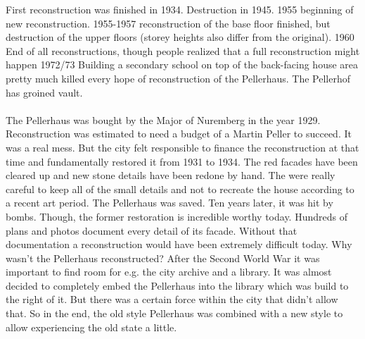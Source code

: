 First reconstruction was finished in 1934.
Destruction in 1945.
1955 beginning of new reconstruction.
1955-1957 reconstruction of the base floor finished, but destruction of the upper floors (storey heights also differ from the original).
1960 End of all reconstructions, though people realized that a full reconstruction might happen
1972/73 Building a secondary school on top of the back-facing house area pretty much killed every hope of reconstruction of the Pellerhaus.
The Pellerhof has groined vault.\parencite{afPellerhausMagazin01} \\\\

The Pellerhaus was bought by the Major of Nuremberg in the year 1929. Reconstruction was estimated to need a budget of a Martin Peller to succeed. It was a real mess. But the city felt responsible to finance the reconstruction at that time and fundamentally restored it from 1931 to 1934. The red facades have been cleared up and new stone details have been redone by hand. The were really careful to keep all of the small details and not to recreate the house according to a recent art period. The Pellerhaus was saved. Ten years later, it was hit by bombs. Though, the former restoration is incredible worthy today. Hundreds of plans and photos document every detail of its facade. Without that documentation a reconstruction would have been extremely difficult today.
Why wasn't the Pellerhaus reconstructed?
After the Second World War it was important to find room for e.g. the city archive and a library. It was almost decided to completely embed the Pellerhaus into the library which was build to the right of it. But there was a certain force within the city that didn't allow that. So in the end, the old style Pellerhaus was combined with a new style to allow experiencing the old state a little.\parencite{afPellerhausMagazin02} \\\\

